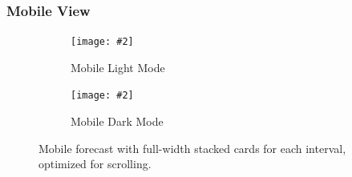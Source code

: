 \documentclass[11pt,a4paper]{article}
\newcommand{\maxgraph}[2][]{%
  \texttt{[image: \#2]}%
}
\begin{document}
\subsubsection*{Mobile View}
\FloatBarrier
\begin{figure}[H]
  \centering
  \begin{subfigure}{0.48\linewidth}
    \maxgraph[width=\linewidth]{forecast_lightmode_mobile.jpg}
    \caption{Mobile Light Mode}
  \end{subfigure}\hfill
  \begin{subfigure}{0.48\linewidth}
    \maxgraph[width=\linewidth]{forecast_darkmode_mobile.jpg}
    \caption{Mobile Dark Mode}
  \end{subfigure}
  \caption{Mobile forecast with full-width stacked cards for each interval, optimized for scrolling.}
  \label{fig:forecast_mobile}
\end{figure}
\FloatBarrier
\end{document}
